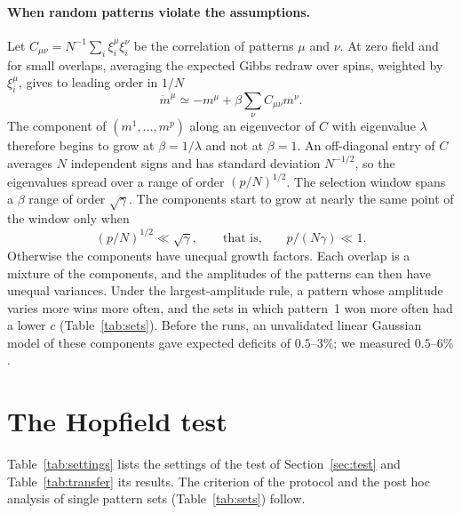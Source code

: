 \documentclass[final]{dynafront2026}
\begin{document}
\paragraph{When random patterns violate the assumptions.}
Let $C_{\mu\nu}=N^{-1}\sum_i\xi_i^\mu\xi_i^\nu$ be the correlation of
patterns $\mu$ and $\nu$. At zero field and for small overlaps, averaging the
expected Gibbs redraw over spins, weighted by $\xi_i^\mu$, gives to leading
order in $1/N$
\[
 \dot m^\mu\simeq-m^\mu+\beta\sum_\nu C_{\mu\nu}m^\nu .
\]
The component of $(m^1,\ldots,m^p)$ along an eigenvector of $C$ with
eigenvalue $\lambda$ therefore begins to grow at $\beta=1/\lambda$ and not at
$\beta=1$. An off-diagonal entry of $C$ averages $N$ independent signs and
has standard deviation $N^{-1/2}$, so the eigenvalues spread over a range of
order $(p/N)^{1/2}$. The selection window spans a $\beta$ range of order
$\sqrt\gamma$. The components start to grow at nearly the same point of the
window only when
\[
 (p/N)^{1/2}\ll\sqrt\gamma,\qquad\text{that is,}\qquad p/(N\gamma)\ll1 .
\]
Otherwise the components have unequal growth factors. Each overlap is a
mixture of the components, and the amplitudes of the patterns can then have
unequal variances. Under the largest-amplitude rule, a pattern whose amplitude varies more wins more often, and
the sets in which pattern~1 won more often had a lower $c$ (Table~\ref{tab:sets}). Before the
runs, an unvalidated linear Gaussian model of these components gave expected
deficits of $0.5$--$3\%$; we measured $0.5$--$6\%$.

\section{The Hopfield test}
\label{app:protocol}

Table~\ref{tab:settings} lists the settings of the test of
Section~\ref{sec:test} and Table~\ref{tab:transfer} its results. The
criterion of the protocol and the post hoc analysis of single pattern sets
(Table~\ref{tab:sets}) follow.
\end{document}
